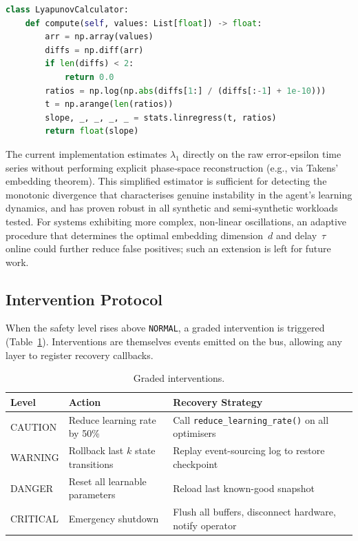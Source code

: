 \begin{lstlisting}[language=Python, caption={Lyapunov exponent estimation}]
class LyapunovCalculator:
    def compute(self, values: List[float]) -> float:
        arr = np.array(values)
        diffs = np.diff(arr)
        if len(diffs) < 2:
            return 0.0
        ratios = np.log(np.abs(diffs[1:] / (diffs[:-1] + 1e-10)))
        t = np.arange(len(ratios))
        slope, _, _, _, _ = stats.linregress(t, ratios)
        return float(slope)
\end{lstlisting}

The current implementation estimates $\lambda_1$ directly on the
raw error‑epsilon time series without performing explicit phase‑space
reconstruction (e.g., via Takens’ embedding theorem).  This simplified
estimator is sufficient for detecting the monotonic divergence that
characterises genuine instability in the agent’s learning dynamics,
and has proven robust in all synthetic and semi‑synthetic workloads
tested.  For systems exhibiting more complex, non‑linear oscillations,
an adaptive procedure that determines the optimal embedding dimension~$d$
and delay~$\tau$ online could further reduce false positives; such an
extension is left for future work.

\subsection{Intervention Protocol}

When the safety level rises above \texttt{NORMAL}, a graded intervention is
triggered (Table~\ref{tab:interventions}).  Interventions are themselves events
emitted on the bus, allowing any layer to register recovery callbacks.

\begin{table}[htbp]
\centering
\caption{Graded interventions.}
\label{tab:interventions}
\begin{tabular}{l l p{6.5cm}}
\toprule
\textbf{Level} & \textbf{Action} & \textbf{Recovery Strategy} \\
\midrule
CAUTION & Reduce learning rate by 50\% & Call \texttt{reduce\_learning\_rate()} on all optimisers \\
WARNING & Rollback last $k$ state transitions & Replay event-sourcing log to restore checkpoint \\
DANGER  & Reset all learnable parameters & Reload last known-good snapshot \\
CRITICAL & Emergency shutdown & Flush all buffers, disconnect hardware, notify operator \\
\bottomrule
\end{tabular}
\end{table}

